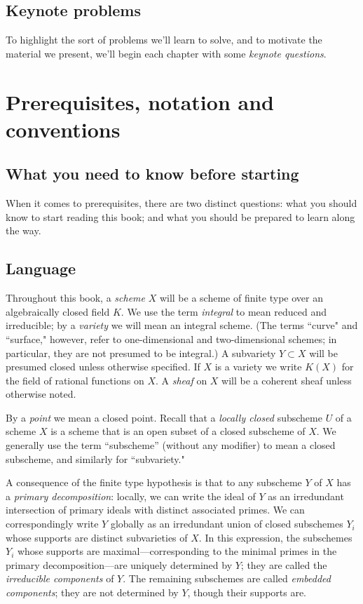 \subsection{Keynote problems} To highlight the sort of problems we'll  learn to solve, and to motivate the material we present, we'll begin each chapter with some {\it keynote questions}. 


\section{Prerequisites, notation and conventions}

\subsection{What you need to know before starting}
When it comes to prerequisites, there are two distinct questions: what you should know to start reading this book; and what you should be prepared to learn along the way. 


\subsection{Language}
 

Throughout this book, a \emph{scheme} $X$ will be a scheme of finite type over an algebraically closed field
$K$. We use the term \emph{integral} to mean reduced and irreducible; by a \emph{variety} we will mean an integral scheme. (The terms ``curve" and ``surface," however, refer to one-dimensional and two-dimensional schemes; in particular, they are not presumed to be integral.) A subvariety $Y \subset X$ will be presumed closed unless otherwise specified.
 If $X$ is a variety we write $K(X)$ for the field of rational functions on $X$. A \emph{sheaf} on $X$ will be a coherent sheaf unless otherwise noted.
 
By a \emph{point}
we mean a closed point. 
Recall that a \emph{locally closed} subscheme $U$ of a scheme $X$ is 
a scheme that is an open subset of a closed subscheme of $X$. We generally use the term
``subscheme'' (without any modifier) to mean a closed subscheme, and similarly for ``subvariety."

A consequence of the finite type hypothesis
is that to any subscheme $Y$ of 
$X$ has a \emph{primary decomposition}: locally, we can write the ideal of $Y$ as an irredundant intersection of primary ideals with distinct associated primes. We can correspondingly write $Y$ globally as an irredundant union of closed subschemes $Y_i$ whose supports are distinct subvarieties of $X$. In this expression, the subschemes $Y_i$ whose supports are maximal---corresponding to the minimal primes in the primary decomposition---are uniquely determined by $Y$; they are called the \emph{irreducible components} of $Y$. The remaining subschemes are called \emph{embedded components}; they are not determined by $Y$, though their supports are.

